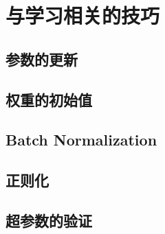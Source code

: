 \chapter{与学习相关的技巧}
\section{参数的更新}
\section{权重的初始值}
\section{Batch Normalization}
\section{正则化}
\section{超参数的验证}